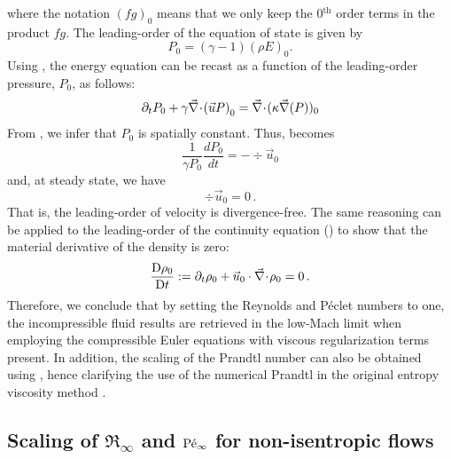 %
where the notation $(fg)_0$ means that we only keep the 0$^{\text{th}}$ order terms in the product $fg$. The leading-order of the equation of state is given by 
\begin{equation}
\label{eq:leading_order_eos}
 P_0 = (\gamma - 1) (\rho E)_0 .
\end{equation}
%
Using , the energy equation can be recast as a function of the leading-order pressure, $P_0$, as follows:
%
\begin{equation}\label{eq:asympt_equ3_ener}
 \partial_t P_0 + \gamma \vec{\nabla}\! \cdot \! \left( \vec{u} P \right)_0 =  \vec{\nabla}\! \cdot \!(\kappa \vec{\nabla}(P))_0
\end{equation}
%
From , we infer that $P_0$ is spatially constant. Thus,  becomes
%
\begin{equation}
\frac{1}{\gamma P_0} \frac{d P_0}{dt} = - \div \vec{u}_0 
\end{equation}
%
and, at steady state, we have
%
\begin{equation}
 \div  \vec{u}_0 = 0 \, .
\end{equation}
%
That is, the leading-order of velocity is divergence-free. The same reasoning can be applied to the leading-order of the continuity equation () to show that the material derivative of the density is zero:
\begin{equation}
\frac{\textrm{D} \rho_0}{\textrm{D} t} := \partial_t \rho_0 + \vec{u}_0 \cdot \vec{\nabla}\! \cdot \! \rho_0 = 0 \, .
\end{equation}
%
Therefore, we conclude that by setting the Reynolds and P\'eclet numbers to one, the incompressible fluid results are retrieved in the low-Mach limit when employing the compressible Euler equations with viscous regularization terms present. In addition, the scaling of the Prandtl number can also be obtained using , hence clarifying the use of the numerical Prandtl in the original entropy viscosity method \cite{jlg1}.

\subsection{Scaling of $\Re_\infty$ and $\textrm{P\'e}_\infty$ for non-isentropic flows} \label{sec:nonisentropic}

